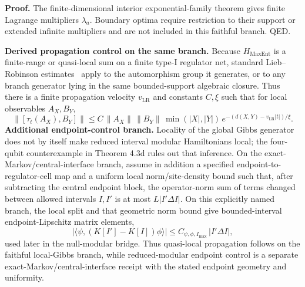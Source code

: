 \textbf{Proof.} The finite-dimensional interior exponential-family theorem gives finite Lagrange multipliers \(\lambda_a\). Boundary optima require restriction to their support or extended infinite multipliers and are not included in this faithful branch. QED.

\textbf{Derived propagation control on the same branch.} Because \(H_{\mathrm{MaxEnt}}\) is a finite-range or quasi-local sum on a finite type-I regulator net, standard Lieb--Robinson estimates~\cite{liebRobinson72} apply to the automorphism group it generates, or to any branch generator lying in the same bounded-support algebraic closure. Thus there is a finite propagation velocity \(v_{\mathrm{LR}}\) and constants \(C,\xi\) such that for local observables \(A_X,B_Y\),
\[
\bigl\|[\tau_t(A_X),B_Y]\bigr\|
\le
C\,\|A_X\|\,\|B_Y\|\,\min(|X|,|Y|)\,
e^{-(d(X,Y)-v_{\mathrm{LR}}|t|)/\xi}.
\]
\textbf{Additional endpoint-control branch.} Locality of the global Gibbs generator does not by
itself make reduced interval modular Hamiltonians local; the four-qubit counterexample in
Theorem 4.3d rules out that inference. On the exact-Markov/central-interface branch, assume in
addition a specified endpoint-to-regulator-cell map and a uniform local norm/site-density bound
such that, after subtracting the central endpoint block, the operator-norm sum of terms changed
between allowed intervals \(I,I'\) is at most \(L|I'\Delta I|\). On this explicitly named branch,
the local split and that geometric norm bound give bounded-interval endpoint-Lipschitz matrix elements,
\[
\left|\langle\psi,(K[I']-K[I])\phi\rangle\right|
\le
C_{\psi,\phi,I_{\max}}\,|I'\Delta I|,
\]
used later in the null-modular bridge. Thus quasi-local propagation follows on the faithful local-Gibbs branch, while reduced-modular endpoint control is a separate exact-Markov/central-interface receipt with the stated endpoint geometry and uniformity.

